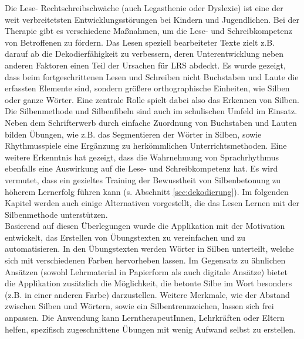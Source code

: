 Die Lese- Rechtschreibschwäche (auch Legasthenie oder Dyslexie) ist eine der weit verbreitetsten Entwicklungsstörungen bei Kindern und Jugendlichen\cite{Mayer2016}. Bei der Therapie gibt es verschiedene Maßnahmen, um die Lese- und Schreibkompetenz von Betroffenen zu fördern. Das Lesen speziell bearbeiteter Texte zielt z.B. darauf ab die Dekodierfähigkeit zu verbessern, deren Unterentwicklung neben anderen Faktoren einen Teil der Ursachen für LRS abdeckt\cite{Schulte-Koerne2014}. Es wurde gezeigt, dass beim fortgeschrittenen Lesen und Schreiben nicht Buchstaben und Laute die erfassten Elemente sind, sondern größere orthographische Einheiten, wie Silben oder ganze Wörter\cite{Steinbrink2014}. Eine zentrale Rolle spielt dabei also das Erkennen von Silben. Die Silbenmethode und Silbenfibeln sind auch im schulischen Umfeld im Einsatz. Neben dem Schrifterwerb durch einfache Zuordnung von Buchstaben und Lauten bilden Übungen, wie z.B. das Segmentieren der Wörter in Silben, sowie Rhythmusspiele eine Ergänzung zu herkömmlichen Unterrichtsmethoden\cite{Bredel2010}. Eine weitere Erkenntnis hat gezeigt, dass die Wahrnehmung von Sprachrhythmus ebenfalls eine Auswirkung auf die Lese- und Schreibkompetenz hat\cite{Brandelik2014}. Es wird vermutet, dass ein gezieltes Training der Bewusstheit von Silbenbetonung zu höherem Lernerfolg führen kann\cite{Holz2017d} (s. Abschnitt \ref{sec:dekodierung}). Im folgenden Kapitel werden auch einige Alternativen vorgestellt, die das Lesen Lernen mit der Silbenmethode unterstützen.\\
Basierend auf diesen Überlegungen wurde die Applikation mit der Motivation entwickelt, das Erstellen von Übungstexten zu vereinfachen und zu automatisieren. In den Übungstexten werden Wörter in Silben unterteilt, welche sich mit verschiedenen Farben hervorheben lassen. Im Gegensatz zu ähnlichen Ansätzen (sowohl Lehrmaterial in Papierform als auch digitale Ansätze) bietet die Applikation zusätzlich die Möglichkeit, die betonte Silbe im Wort besonders (z.B. in einer anderen Farbe) darzustellen. Weitere Merkmale, wie der Abstand zwischen Silben und Wörtern, sowie ein Silbentrennzeichen, lassen sich frei anpassen. Die Anwendung kann LerntherapeutInnen, Lehrkräften oder Eltern helfen, spezifisch zugeschnittene Übungen mit wenig Aufwand selbst zu erstellen.\\

